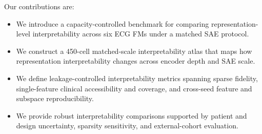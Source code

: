 Our contributions are:
\begin{itemize}[leftmargin=1.3em,itemsep=1pt,topsep=2pt]
  \item We introduce a capacity-controlled benchmark for comparing representation-level interpretability across six ECG FMs under a matched SAE protocol.
  \item We construct a 450-cell matched-scale interpretability atlas that maps how representation interpretability changes across encoder depth and SAE scale.
  \item We define leakage-controlled interpretability metrics spanning sparse fidelity, single-feature clinical accessibility and coverage, and cross-seed feature and subspace reproducibility.
  \item We provide robust interpretability comparisons supported by patient and design uncertainty, sparsity sensitivity, and external-cohort evaluation.
\end{itemize}
